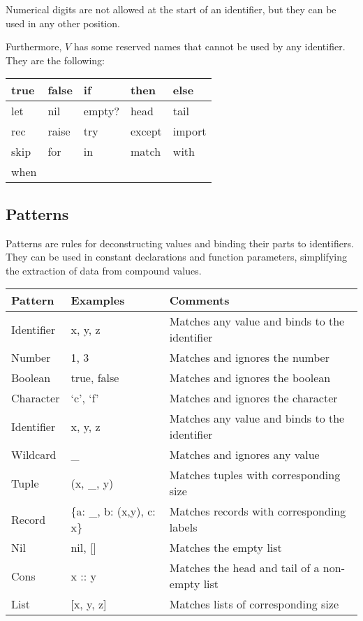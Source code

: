 \documentclass{article}
\begin{document}
\bigskip

Numerical digits are not allowed at the start of an identifier, but they can be used in any other position.

Furthermore, $V$ has some reserved names that cannot be used by any identifier.
They are the following:

\medskip

\begin{tabular}{|l|l|l|l|l|}
  \hline
  true & false & if & then & else\\
  \hline
  let & nil & empty? & head & tail\\
  \hline
  rec & raise & try & except & import\\
  \hline
  skip & for & in & match & with\\
  \hline
  when\\
  \hline
\end{tabular}

\subsection{Patterns}

Patterns are rules for deconstructing values and binding their parts to identifiers.
They can be used in constant declarations and function parameters, simplifying the extraction of data from compound values.

\medskip

\begin{tabular}{|l|l|l|}
  \hline
  \textbf{Pattern} & \textbf{Examples} & \textbf{Comments}\\
  \hline
  Identifier & x, y, z & Matches any value and binds to the identifier\\
  \hline
  Number & 1, 3 & Matches and ignores the number\\
  \hline
  Boolean & true, false & Matches and ignores the boolean\\
  \hline
  Character & `c', `f' & Matches and ignores the character\\
  \hline
  Identifier & x, y, z & Matches any value and binds to the identifier\\
  \hline
  Wildcard & _ & Matches and ignores any value\\
  \hline
  Tuple & (x, _, y) & Matches tuples with corresponding size\\
  \hline
  Record & \{a: _, b: (x,y), c: x\} & Matches records with corresponding labels\\
  \hline
  Nil & nil, [] & Matches the empty list\\
  \hline
  Cons & x :: y & Matches the head and tail of a non-empty list\\
  \hline
  List & [x, y, z] & Matches lists of corresponding size\\
  \hline
\end{tabular}
\end{document}
